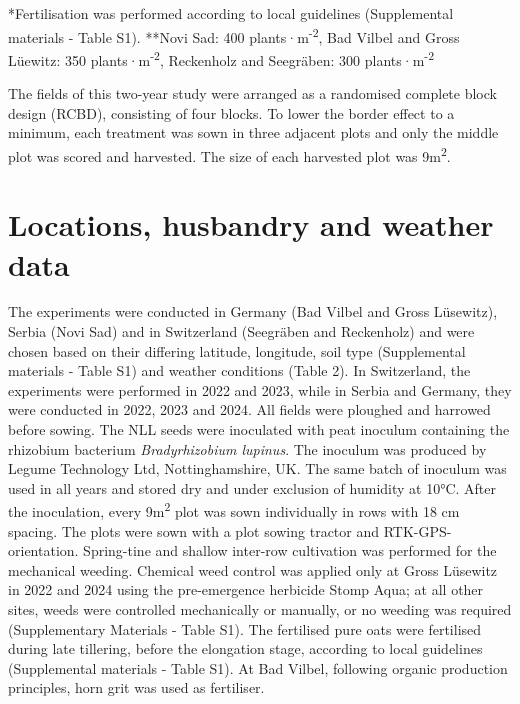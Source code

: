 \documentclass[
  british,
  a4paper,
  DIV=11,
  numbers=noendperiod]{scrreprt}
\begin{document}
*Fertilisation was performed according to local guidelines (Supplemental
materials - Table S1). **Novi Sad: 400 plants·m\textsuperscript{-2}, Bad
Vilbel and Gross Lüewitz: 350 plants·m\textsuperscript{-2}, Reckenholz
and Seegräben: 300 plants·m\textsuperscript{-2}

The fields of this two-year study were arranged as a randomised complete
block design (RCBD), consisting of four blocks. To lower the border
effect to a minimum, each treatment was sown in three adjacent plots and
only the middle plot was scored and harvested. The size of each
harvested plot was 9m\textsuperscript{2}.

\section{Locations, husbandry and weather
data}\label{locations-husbandry-and-weather-data}

The experiments were conducted in Germany (Bad Vilbel and Gross
Lüsewitz), Serbia (Novi Sad) and in Switzerland (Seegräben and
Reckenholz) and were chosen based on their differing latitude,
longitude, soil type (Supplemental materials - Table S1) and weather
conditions (Table 2). In Switzerland, the experiments were performed in
2022 and 2023, while in Serbia and Germany, they were conducted in 2022,
2023 and 2024. All fields were ploughed and harrowed before sowing. The
NLL seeds were inoculated with peat inoculum containing the rhizobium
bacterium \emph{Bradyrhizobium lupinus}. The inoculum was produced by
Legume Technology Ltd, Nottinghamshire, UK. The same batch of inoculum
was used in all years and stored dry and under exclusion of humidity at
10°C. After the inoculation, every 9m\textsuperscript{2} plot was sown
individually in rows with 18 cm spacing. The plots were sown with a plot
sowing tractor and RTK-GPS-orientation. Spring-tine and shallow
inter-row cultivation was performed for the mechanical weeding. Chemical
weed control was applied only at Gross Lüsewitz in 2022 and 2024 using
the pre-emergence herbicide Stomp Aqua; at all other sites, weeds were
controlled mechanically or manually, or no weeding was required
(Supplementary Materials - Table S1). The fertilised pure oats were
fertilised during late tillering, before the elongation stage, according
to local guidelines (Supplemental materials - Table S1). At Bad Vilbel,
following organic production principles, horn grit was used as
fertiliser.

\begin{table}

\caption{\label{tbl-weather}}


\end{table}%
\end{document}
